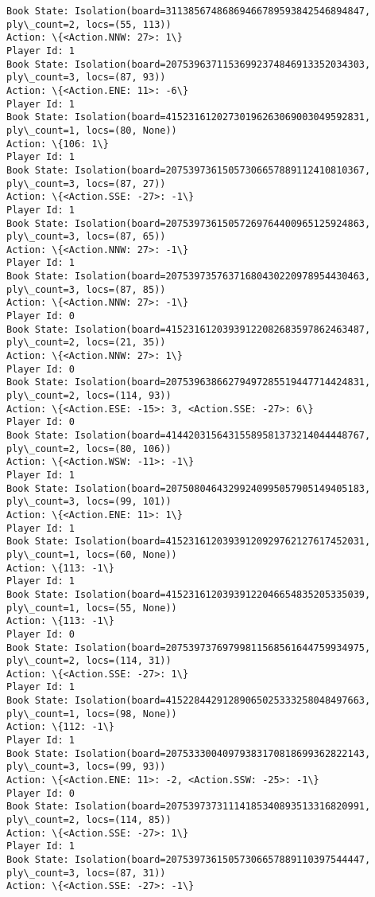 \documentclass[11pt]{article}
\begin{document}
\begin{Verbatim}[commandchars=\\\{\}]
Book State: Isolation(board=31138567486869466789593842546894847, ply\_count=2, locs=(55, 113))
Action: \{<Action.NNW: 27>: 1\}
Player Id: 1
Book State: Isolation(board=20753963711536992374846913352034303, ply\_count=3, locs=(87, 93))
Action: \{<Action.ENE: 11>: -6\}
Player Id: 1
Book State: Isolation(board=41523161202730196263069003049592831, ply\_count=1, locs=(80, None))
Action: \{106: 1\}
Player Id: 1
Book State: Isolation(board=20753973615057306657889112410810367, ply\_count=3, locs=(87, 27))
Action: \{<Action.SSE: -27>: -1\}
Player Id: 1
Book State: Isolation(board=20753973615057269764400965125924863, ply\_count=3, locs=(87, 65))
Action: \{<Action.NNW: 27>: -1\}
Player Id: 1
Book State: Isolation(board=20753973576371680430220978954430463, ply\_count=3, locs=(87, 85))
Action: \{<Action.NNW: 27>: -1\}
Player Id: 0
Book State: Isolation(board=41523161203939122082683597862463487, ply\_count=2, locs=(21, 35))
Action: \{<Action.NNW: 27>: 1\}
Player Id: 0
Book State: Isolation(board=20753963866279497285519447714424831, ply\_count=2, locs=(114, 93))
Action: \{<Action.ESE: -15>: 3, <Action.SSE: -27>: 6\}
Player Id: 0
Book State: Isolation(board=41442031564315589581373214044448767, ply\_count=2, locs=(80, 106))
Action: \{<Action.WSW: -11>: -1\}
Player Id: 1
Book State: Isolation(board=20750804643299240995057905149405183, ply\_count=3, locs=(99, 101))
Action: \{<Action.ENE: 11>: 1\}
Player Id: 1
Book State: Isolation(board=41523161203939120929762127617452031, ply\_count=1, locs=(60, None))
Action: \{113: -1\}
Player Id: 1
Book State: Isolation(board=41523161203939122046654835205335039, ply\_count=1, locs=(55, None))
Action: \{113: -1\}
Player Id: 0
Book State: Isolation(board=20753973769799811568561644759934975, ply\_count=2, locs=(114, 31))
Action: \{<Action.SSE: -27>: 1\}
Player Id: 1
Book State: Isolation(board=41522844291289065025333258048497663, ply\_count=1, locs=(98, None))
Action: \{112: -1\}
Player Id: 1
Book State: Isolation(board=20753330040979383170818699362822143, ply\_count=3, locs=(99, 93))
Action: \{<Action.ENE: 11>: -2, <Action.SSW: -25>: -1\}
Player Id: 0
Book State: Isolation(board=20753973731114185340893513316820991, ply\_count=2, locs=(114, 85))
Action: \{<Action.SSE: -27>: 1\}
Player Id: 1
Book State: Isolation(board=20753973615057306657889110397544447, ply\_count=3, locs=(87, 31))
Action: \{<Action.SSE: -27>: -1\}


\end{Verbatim}
\end{document}
